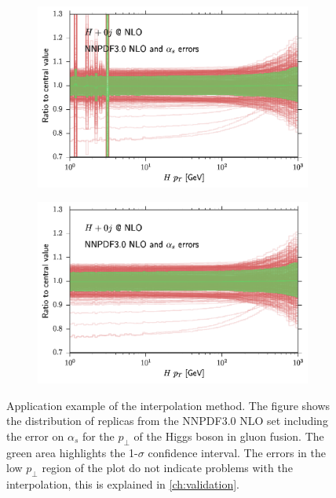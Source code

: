 \begin{figure}
	\centering
	\begin{subfigure}[]{0.49\textwidth}
		\includegraphics[width=\textwidth]{images/nnpdf_band_appl.pdf}
		\caption{\appl{}}
	\end{subfigure}
	\hfill
	\begin{subfigure}[]{0.49\textwidth}
		\includegraphics[width=\textwidth]{images/nnpdf_band_fnlo.pdf}
		\caption{\fnlo{}}
	\end{subfigure}
	\caption{Application example of the interpolation method.
				The figure shows the distribution of replicas from the NNPDF3.0 NLO set including the error on $\alpha_s$ for the $p_\perp$ of the Higgs boson in gluon fusion.
				The green area highlights the 1-$\sigma$ confidence interval.
				The errors in the low $p_\perp$ region of the \appl{} plot do not indicate problems with the interpolation, this is explained in \cref{ch:validation}.}
	\label{fig:nnpdf_band}
\end{figure}
%
